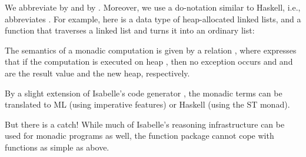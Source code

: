 \documentclass[copyright,creativecommons,sharealike]{eptcs}
\theoremstyle{remark}
\begin{document}
\begin{isabellebody}
\begin{isamarkuptext}
  We abbreviate  by  and
   by . Moreover, we use a do-notation similar to
  Haskell, i.e.,  abbreviates
  .
For example, here is a data type of heap-allocated linked lists, and
  a function  that traverses a linked list and turns it into an
  ordinary list:
\begin{quote}\parskip=0pt
\end{quote}
\begin{quote}\parskip=0pt
\end{quote}
The semantics of a monadic computation  is given by a
relation , where  expresses that
if the computation is executed on heap , then no
exception occurs and  and  are the result
value and the new heap, respectively.

By a slight extension of Isabelle's code
generator \cite{HaftmannN2010}, the monadic terms can be translated to ML (using
imperative features) or Haskell (using the ST monad).\end{isamarkuptext}\isamarkuptrue {}
\isamarkuptrue \begin{isamarkuptext}But there is a catch! While much of Isabelle's reasoning infrastructure can
  be used for monadic programs as well, the function package
  cannot cope with functions as simple as  above.


\end{isamarkuptext}
\end{isabellebody}
\end{document}
